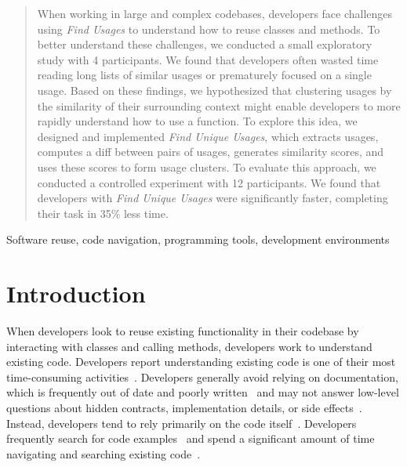 \documentclass[conference]{IEEEtran}
\begin{document}
\begin{abstract}
When working in large and complex codebases, developers face challenges using \textit{Find Usages} to understand how to reuse classes and methods. To better understand these challenges, we conducted a small exploratory study with 4 participants. We found that developers often wasted time reading long lists of similar usages or prematurely focused on a single usage. Based on these findings, we hypothesized that clustering usages by the similarity of their surrounding context might enable developers to more rapidly understand how to use a function. To explore this idea, we designed and implemented \textit{Find Unique Usages}, which extracts usages, computes a diff between pairs of usages, generates similarity scores, and uses these scores to form usage clusters. To evaluate this approach, we conducted a controlled experiment with 12 participants. We found that developers with \textit{Find Unique Usages} were  significantly  faster,  completing  their  task  in  35\%  less time.
\end{abstract}


\begin{IEEEkeywords}
Software reuse, code navigation, programming tools, development environments
\end{IEEEkeywords}


\section{Introduction}

When developers look to reuse existing functionality in their codebase by interacting with classes and calling methods, developers work to understand existing code. Developers report understanding existing code is one of their most time-consuming activities~\cite{latoza2006maintaining}. Developers generally avoid relying on documentation, which is frequently out of date and poorly written~\cite{documentation} and may not answer low-level questions about hidden contracts, implementation details, or side effects~\cite{head2018not}. Instead, developers tend to rely primarily on the code itself~\cite{head2018not, latoza2006maintaining}. Developers frequently search for code examples~\cite{brandt2009two,sadowski2015developers} and spend a significant amount of time navigating and searching existing code~\cite{piorkowski2016foraging,ko2006exploratory}.
\end{document}
